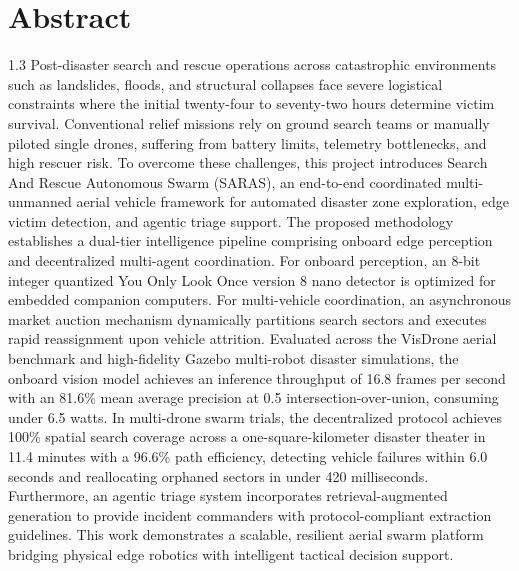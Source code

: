 \chapter*{Abstract}
\begin{spacing}{1.3}
Post-disaster search and rescue operations across catastrophic environments such as landslides, floods, and structural collapses face severe logistical constraints where the initial twenty-four to seventy-two hours determine victim survival. Conventional relief missions rely on ground search teams or manually piloted single drones, suffering from battery limits, telemetry bottlenecks, and high rescuer risk. To overcome these challenges, this project introduces Search And Rescue Autonomous Swarm (SARAS), an end-to-end coordinated multi-unmanned aerial vehicle framework for automated disaster zone exploration, edge victim detection, and agentic triage support. The proposed methodology establishes a dual-tier intelligence pipeline comprising onboard edge perception and decentralized multi-agent coordination. For onboard perception, an 8-bit integer quantized You Only Look Once version 8 nano detector is optimized for embedded companion computers. For multi-vehicle coordination, an asynchronous market auction mechanism dynamically partitions search sectors and executes rapid reassignment upon vehicle attrition. Evaluated across the VisDrone aerial benchmark and high-fidelity Gazebo multi-robot disaster simulations, the onboard vision model achieves an inference throughput of 16.8 frames per second with an 81.6\% mean average precision at 0.5 intersection-over-union, consuming under 6.5 watts. In multi-drone swarm trials, the decentralized protocol achieves 100\% spatial search coverage across a one-square-kilometer disaster theater in 11.4 minutes with a 96.6\% path efficiency, detecting vehicle failures within 6.0 seconds and reallocating orphaned sectors in under 420 milliseconds. Furthermore, an agentic triage system incorporates retrieval-augmented generation to provide incident commanders with protocol-compliant extraction guidelines. This work demonstrates a scalable, resilient aerial swarm platform bridging physical edge robotics with intelligent tactical decision support.
\end{spacing}

